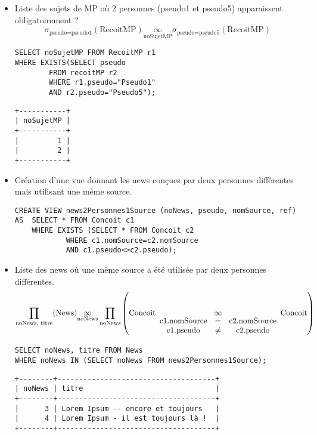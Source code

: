 \begin{itemize}
	\item Liste des sujets de MP où 2 personnes (pseudo1 et pseudo5) apparaissent obligatoirement ?
	\[\sigma_{\text{pseudo=pseudo1}}(\text{RecoitMP})\underset{\text{noSujetMP}}{\infty} \sigma_{\text{pseudo=pseudo5}}(\text{RecoitMP})\]
		\begin{verbatim}
SELECT noSujetMP FROM RecoitMP r1
WHERE EXISTS(SELECT pseudo 
		FROM recoitMP r2
		WHERE r1.pseudo="Pseudo1"
		AND r2.pseudo="Pseudo5");
		\end{verbatim}
\begin{verbatim}
+-----------+
| noSujetMP |
+-----------+
|         1 |
|         2 |
+-----------+
\end{verbatim}

	\item Création d'une vue donnant les news conçues par deux personnes différentes mais utilisant une même source.
		\begin{verbatim}
CREATE VIEW news2Personnes1Source (noNews, pseudo, nomSource, ref)
AS	SELECT * FROM Concoit c1
	WHERE EXISTS (SELECT * FROM Concoit c2
			WHERE c1.nomSource=c2.nomSource
			AND c1.pseudo<>c2.pseudo);
		\end{verbatim}

	\item Liste des news où une même source a été utilisée par deux personnes différentes.
	\[\prod_{\text{noNews, titre}}(\text{News})\underset{\text{noNews}}{\infty} \prod_{\text{noNews}}\left(\text{Concoit} \underset{\begin{array}{c c c}\text{c1.nomSource}&=&\text{c2.nomSource}\\ \text{c1.pseudo}&\neq&\text{c2.pseudo}\end{array}}{\infty}\text{Concoit} \right)\]
	\begin{verbatim}
SELECT noNews, titre FROM News
WHERE noNews IN (SELECT noNews FROM news2Personnes1Source);
	\end{verbatim}
\begin{verbatim}
+--------+-------------------------------------+
| noNews | titre                               |
+--------+-------------------------------------+
|      3 | Lorem Ipsum -- encore et toujours   |
|      4 | Lorem Ipsum - il est toujours là !  |
+--------+-------------------------------------+
\end{verbatim}


\end{itemize}
